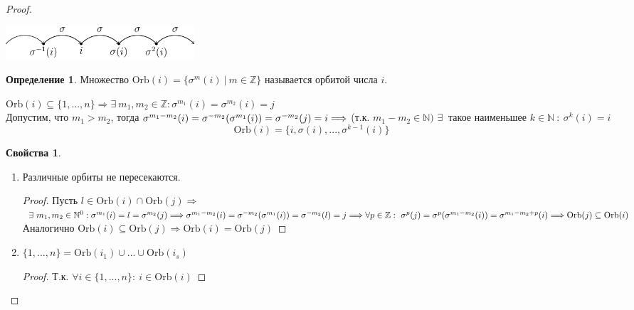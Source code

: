 \documentclass[a4paper, 12pt]{article}
\newcommand{\Z}{\mathbb Z}
\newcommand{\N}{\mathbb N}
\newcommand\tab[1][.5cm]{\hspace*{#1}}
\theoremstyle{definition}
\newtheorem*{definition}{Определение}
\newtheorem*{properties}{Свойства}
\begin{document}
\begin{proof}
\begin{itemize}
\begin{center}
      \includegraphics[width=7cm]{image/lecture-18.pdf}
    \end{center}
    \begin{definition}
      Множество $\textrm{Orb}(i) = \{\sigma^m(i) \ | \ m \in \Z\}$  называется орбитой числа $i$.
    \end{definition} 
     $\textrm{Orb}(i) \subseteq \{1,...,n\} \Longrightarrow \exists \ m_1,m_2 \in \Z: \sigma^{m_1}(i) = \sigma^{m_2}(i) = j$ \\
     Допустим, что $m_1 > m_2$, тогда $\sigma^{m_1 - m_2}(i) = \sigma^{-m_2}(\sigma^{m_1}(i)) = \sigma^{-m_2}(j) = i \\
     \Longrightarrow $ (т.к. $m_1 - m_2 \in \N)$ $\exists \ $ такое наименьшее $k \in \N \ : \ \sigma^k(i)= i$ 
    $$\textrm{Orb}(i) = \{i, \sigma(i),...,\sigma^{k-1}(i)\}$$
    \begin{properties} \tab
      \begin{enumerate}
        \item Различные орбиты не пересекаются. 
        \begin{proof}
          Пусть $l \in \textrm{Orb}(i) \cap \textrm{Orb}(j) \Longrightarrow$ 
          $\exists \ m_1, m_2 \in \N^0 : 
          \sigma^{m_1}(i) = l = \sigma^{m_2}(j) \Longrightarrow 
          \sigma^{m_1-m_2}(i) = \sigma^{-m_2}(\sigma^{m_1}(i)) = \sigma^{-m_2}(l) = j \Longrightarrow \\ \forall p \in \Z: \ 
          \sigma^{p}(j)= \sigma^p(\sigma^{m_1-m_2}(i)) = \sigma^{m_1-m_2+p}(i)  \Longrightarrow \textrm{Orb}(j) \subseteq  \textrm{Orb}(i)$ \\
        Аналогично $\textrm{Orb}(i) \subseteq \textrm{Orb}(j) \Longrightarrow \textrm{Orb}(i) = \textrm{Orb}(j)$
        \end{proof} 
        \item $\{1,...,n\} = \textrm{Orb}(i_1) \cup ... \cup \textrm{Orb}(i_s)$ 
        \begin{proof}
          Т.к. $\forall i \in \{1,...,n\}: \ i \in \textrm{Orb}(i)$ 
        \end{proof} 
      \end{enumerate}

\end{properties}
\end{itemize}
\end{proof}
\end{document}

